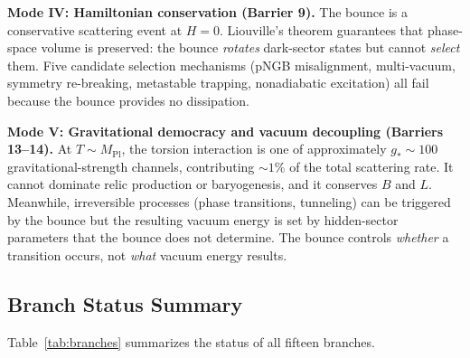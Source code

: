 \medskip
\noindent\textbf{Mode IV: Hamiltonian conservation (Barrier 9).}
The bounce is a conservative scattering event at $H = 0$.  Liouville's theorem
guarantees that phase-space volume is preserved: the bounce \emph{rotates}
dark-sector states but cannot \emph{select} them.  Five candidate selection
mechanisms (pNGB misalignment, multi-vacuum, symmetry re-breaking, metastable
trapping, nonadiabatic excitation) all fail because the bounce provides no
dissipation.

\medskip
\noindent\textbf{Mode V: Gravitational democracy and vacuum decoupling
  (Barriers 13--14).}
At $T \sim M_\mathrm{Pl}$, the torsion interaction is one of approximately
$g_* \sim 100$ gravitational-strength channels, contributing $\sim 1\%$ of the
total scattering rate.  It cannot dominate relic production or baryogenesis,
and it conserves $B$ and $L$.  Meanwhile, irreversible processes (phase
transitions, tunneling) can be triggered by the bounce but the resulting vacuum
energy is set by hidden-sector parameters that the bounce does not determine.
The bounce controls \emph{whether} a transition occurs, not \emph{what} vacuum
energy results.


\subsection{Branch Status Summary}
\label{sec:branch_summary}

Table~\ref{tab:branches} summarizes the status of all fifteen branches.

